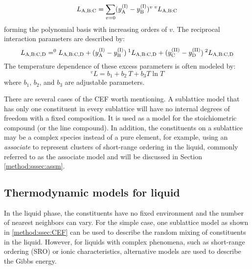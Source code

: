 \begin{equation} \label{method:eq:CEFLabc}
    L_{{\rm A,B}: {\rm C}} = \sum_{v=0}(y_{\rm A}^{({\rm I})}-y_{\rm B}^{({\rm I})})^v\:^vL_{{\rm A, B:C}}
\end{equation}
forming the polynomial basis with increasing orders of $v$. The reciprocal interaction parameters are described by:
\begin{equation} \label{method:eq:CEFLabcd}
    L_{{\rm A,B}:{\rm C,D}}=^0L_{{\rm A,B}:{\rm C,D}}+(y_{\rm A}^{({\rm I})}-y_{\rm B}^{({\rm I})})\:^1L_{{\rm A,B}:{\rm C,D}}+(y_{\rm C}^{({\rm II})}-y_{\rm D}^{({\rm II})})\:^2L_{{\rm A,B}:{\rm C,D}}
\end{equation}
The temperature dependence of these excess parameters is often modeled by:
\begin{equation} \label{method:eq:CEFLT}
    ^vL= b_1 + b_2\:T +b_3T\ln T
\end{equation}
where $b_1$, $b_2$, and $b_3$ are adjustable parameters.

There are several cases of the CEF worth mentioning. A sublattice model
that has only one constituent in every sublattice will have no internal degrees of freedom
with a fixed composition. It is used as a model for the stoichiometric compound (or the line compound). In addition, the constituents on a sublattice may be a complex species instead of a pure element, for example, using an \textit{associate} to represent clusters of short-range ordering in the liquid, commonly referred to as the associate model \cite{sommer1982association} and will be discussed in Section \ref{method:sssec:assm}.

\subsection{Thermodynamic models for liquid} \label{method:ssec:liqmodels}
In the liquid phase, the constituents have no fixed environment and the number of nearest neighbors can vary. For the simple case, one sublattice model as shown in \ref{method:ssec:CEF} can be used to describe the random mixing of constituents in the liquid. However, for liquids with complex phenomena, such as short-range ordering (SRO) or ionic characteristics, alternative models are used to describe the Gibbs energy.

